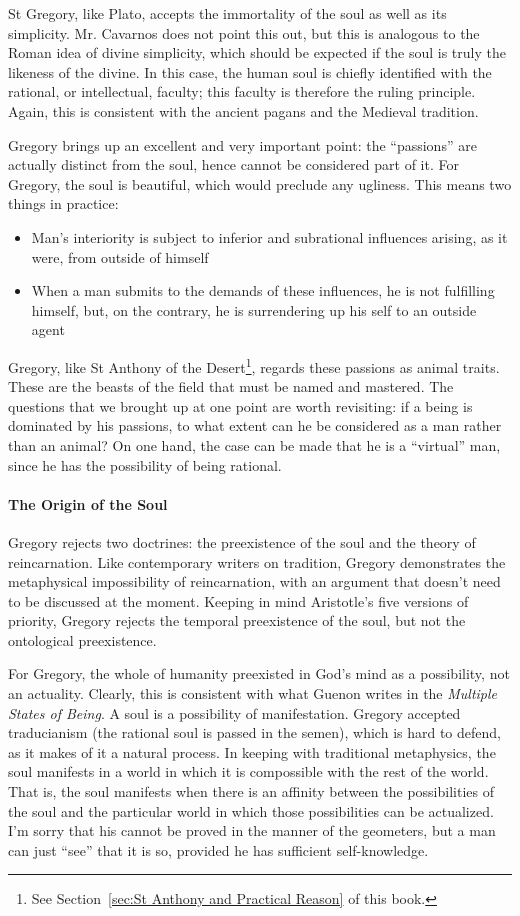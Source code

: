 St Gregory, like Plato, accepts the immortality of the soul as well as its simplicity. Mr. Cavarnos does not point this out, but this is analogous to the Roman idea of divine simplicity, which should be expected if the soul is truly the likeness of the divine. In this case, the human soul is chiefly identified with the rational, or intellectual, faculty; this faculty is therefore the ruling principle. Again, this is consistent with the ancient pagans and the Medieval tradition.

Gregory brings up an excellent and very important point: the “passions” are actually distinct from the soul, hence cannot be considered part of it. For Gregory, the soul is beautiful, which would preclude any ugliness. This means two things in practice:

\begin{itemize}
\item Man's interiority is subject to inferior and subrational influences arising, as it were, from outside of himself 
\item When a man submits to the demands of these influences, he is not fulfilling himself, but, on the contrary, he is surrendering up his self to an outside agent 
\end{itemize}
Gregory, like St Anthony of the Desert\footnote{See Section~\ref{sec:St Anthony and Practical Reason} of this book.}, regards these passions as animal traits. These are the beasts of the field that must be named and mastered. The questions that we brought up at one point are worth revisiting: if a being is dominated by his passions, to what extent can he be considered as a man rather than an animal? On one hand, the case can be made that he is a “virtual” man, since he has the possibility of being rational.

\paragraph{The Origin of the Soul}
Gregory rejects two doctrines: the preexistence of the soul and the theory of reincarnation. Like contemporary writers on tradition, Gregory demonstrates the metaphysical impossibility of reincarnation, with an argument that doesn't need to be discussed at the moment. Keeping in mind Aristotle's five versions of priority, Gregory rejects the temporal preexistence of the soul, but not the ontological preexistence.

For Gregory, the whole of humanity preexisted in God's mind as a possibility, not an actuality. Clearly, this is consistent with what Guenon writes in the \emph{Multiple States of Being}. A soul is a possibility of manifestation. Gregory accepted traducianism (the rational soul is passed in the semen), which is hard to defend, as it makes of it a natural process. In keeping with traditional metaphysics, the soul manifests in a world in which it is compossible with the rest of the world. That is, the soul manifests when there is an affinity between the possibilities of the soul and the particular world in which those possibilities can be actualized. I'm sorry that his cannot be proved in the manner of the geometers, but a man can just “see” that it is so, provided he has sufficient self-knowledge.

